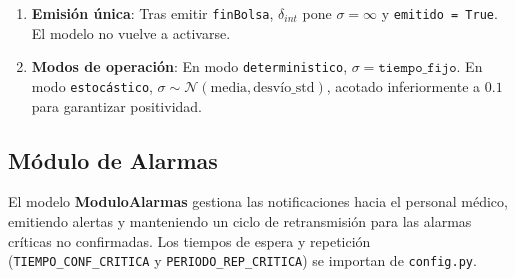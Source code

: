 \documentclass[12pt,a4paper]{article}
\begin{document}
\begin{enumerate}
    \item \textbf{Emisión única}: Tras emitir \texttt{finBolsa},
    $\delta_{\mathit{int}}$ pone $\sigma = \infty$ y
    \texttt{emitido = True}.  El modelo no vuelve a activarse.

    \item \textbf{Modos de operación}: En modo \texttt{deterministico},
    $\sigma = \texttt{tiempo\_fijo}$.  En modo \texttt{estocástico},
    $\sigma \sim \mathcal{N}(\text{media}, \text{desvío\_std})$,
    acotado inferiormente a $0.1$ para garantizar positividad.
\end{enumerate}

\subsection{Módulo de Alarmas}

El modelo \textbf{ModuloAlarmas} gestiona las notificaciones hacia el
personal médico, emitiendo alertas y manteniendo un ciclo de
retransmisión para las alarmas críticas no confirmadas.  Los tiempos
de espera y repetición (\texttt{TIEMPO\_CONF\_CRITICA} y
\texttt{PERIODO\_REP\_CRITICA}) se importan de \texttt{config.py}.
\end{document}
